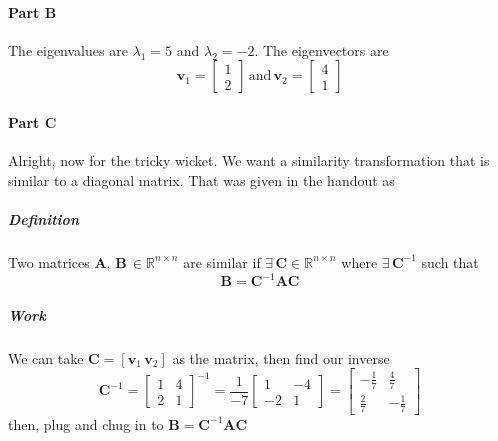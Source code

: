 \documentclass{article}
\begin{document}
            \paragraph{Part B}
                The eigenvalues are $\lambda_1=5$ and $\lambda_2=-2$.
                The eigenvectors are 
                \[
                    \mathbf{v}_1=\begin{bmatrix}1\\2\end{bmatrix}
                    \,\text{and}\,
                    \mathbf{v}_2=\begin{bmatrix}4\\1\end{bmatrix}
                \]
            \paragraph{Part C}
                Alright, now for the tricky wicket. We want a similarity
                transformation that is similar to a diagonal matrix.
                That was given in the handout as
                \subparagraph{Definition}
                    Two matrices $\mathbf{A},\,\mathbf{B}\,\in\mathbb{R}^{n\times{n}}$ are similar
                    if $\exists\,\mathbf{C}\in\mathbb{R}^{n\times{n}}$ 
                    where $\exists\,\mathbf{C}^{-1}$ such that
                    \[
                        \mathbf{B}=\mathbf{C}^{-1}\mathbf{A}\mathbf{C}
                    \]
                \subparagraph{Work}
                    We can take $\mathbf{C}=[\mathbf{v}_1\,\mathbf{v}_2]$ as the matrix,
                    then find our inverse
                    \[
                        \mathbf{C}^{-1}
                        =
                        \begin{bmatrix}1 & 4\\2 & 1\end{bmatrix}^{-1}
                        =
                        \frac{1}{-7}
                        \begin{bmatrix}1 & -4\\-2 & 1\end{bmatrix}
                        =
                        \begin{bmatrix}-\frac{1}{7} & \frac{4}{7}\\\frac{2}{7} & -\frac{1}{7}\end{bmatrix}
                    \]
                    then, plug and chug in to $\mathbf{B}=\mathbf{C}^{-1}\mathbf{A}\mathbf{C}$
\end{document}
